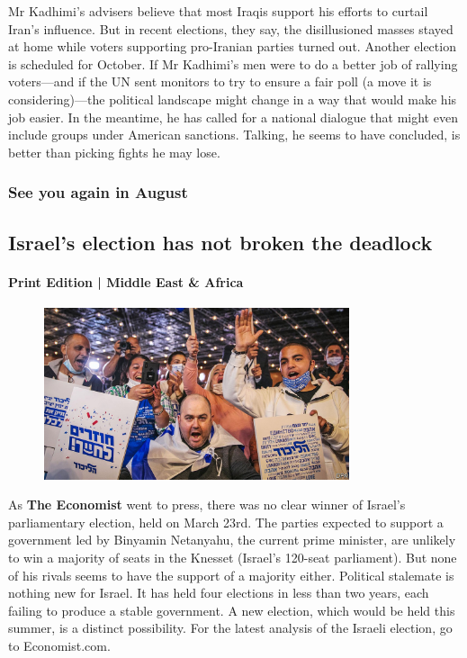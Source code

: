 \documentclass{article}
\begin{document}
Mr Kadhimi's advisers believe that most Iraqis support his efforts to curtail Iran's influence. But in recent elections, they say, the disillusioned masses stayed at home while voters supporting pro-Iranian parties turned out. Another election is scheduled for October. If Mr Kadhimi's men were to do a better job of rallying voters---and if the UN sent monitors to try to ensure a fair poll (a move it is considering)---the political landscape might change in a way that would make his job easier. In the meantime, he has called for a national dialogue that might even include groups under American sanctions. Talking, he seems to have concluded, is better than picking fights he may lose.{} 
\clearpage
\subsubsection{See you again in August }
\subsection{Israel's election has not broken the deadlock }
\paragraph{Print Edition | Middle East \& Africa  \quad \color{gray}{Mar 25th 2021 }}
\begin{figure}[h]
\centering
\includegraphics[width=0.8\textwidth]{images/20210327_MAP002_0.jpg}
\end{figure}
As \textbf{The Economist} went to press, there was no clear winner of Israel's parliamentary election, held on March 23rd. The parties expected to support a government led by Binyamin Netanyahu, the current prime minister, are unlikely to win a majority of seats in the Knesset (Israel's 120-seat parliament). But none of his rivals seems to have the support of a majority either. Political stalemate is nothing new for Israel. It has held four elections in less than two years, each failing to produce a stable government. A new election, which would be held this summer, is a distinct possibility. For the latest analysis of the Israeli election, go to Economist.com. 
\clearpage
\end{document}
